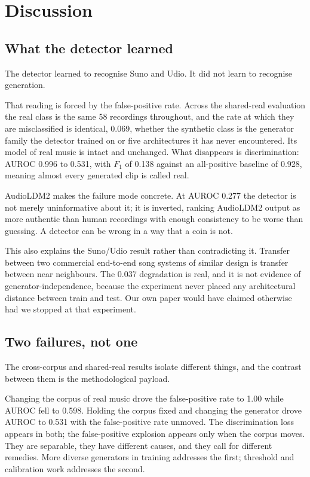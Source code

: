 \section{Discussion}
\label{sec:discussion}

\subsection{What the detector learned}

The detector learned to recognise Suno and Udio. It did not learn to recognise
generation.

That reading is forced by the false-positive rate. Across the shared-real
evaluation the real class is the same 58 recordings throughout, and the rate at
which they are misclassified is identical, 0.069, whether the synthetic class
is the generator family the detector trained on or five architectures it has
never encountered. Its model of real music is intact and unchanged. What
disappears is discrimination: AUROC 0.996 to 0.531, with $F_1$ of 0.138 against
an all-positive baseline of 0.928, meaning almost every generated clip is
called real.

AudioLDM2 makes the failure mode concrete. At AUROC 0.277 the detector is not
merely uninformative about it; it is inverted, ranking AudioLDM2 output as more
authentic than human recordings with enough consistency to be worse than
guessing. A detector can be wrong in a way that a coin is not.

This also explains the Suno/Udio result rather than contradicting it. Transfer
between two commercial end-to-end song systems of similar design is transfer
between near neighbours. The 0.037 degradation is real, and it is not evidence
of generator-independence, because the experiment never placed any architectural
distance between train and test. Our own paper would have claimed otherwise had
we stopped at that experiment.

\subsection{Two failures, not one}

The cross-corpus and shared-real results isolate different things, and the
contrast between them is the methodological payload.

Changing the corpus of real music drove the false-positive rate to 1.00 while
AUROC fell to 0.598. Holding the corpus fixed and changing the generator drove
AUROC to 0.531 with the false-positive rate unmoved. The discrimination loss
appears in both; the false-positive explosion appears only when the corpus
moves. They are separable, they have different causes, and they call for
different remedies. More diverse generators in training addresses the first;
threshold and calibration work addresses the second.

